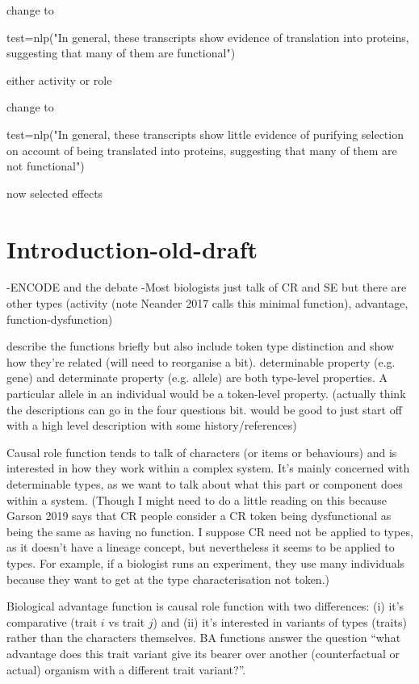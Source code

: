 \documentclass{article}
\begin{document}
change to

test=nlp("In general, these transcripts show evidence of translation into proteins, suggesting that many of them are functional")

either activity or role

change to

test=nlp("In general, these transcripts show little evidence of purifying selection on account of being translated into proteins, suggesting that many of them are not functional")

now selected effects

\section{Introduction-old-draft}
\label{sec:introduction-1}

-ENCODE and the debate
-Most biologists just talk of CR and SE but there are other types (activity (note Neander 2017 calls this minimal function), advantage, function-dysfunction)

describe the functions briefly but also include token type distinction and show how they're related (will need to reorganise a bit). determinable property (e.g. gene) and determinate property (e.g. allele) are both type-level properties. A particular allele in an individual would be a token-level property. (actually think the descriptions can go in the four questions bit. would be good to just start off with a high level description with some history/references)

Causal role function tends to talk of characters (or items or behaviours) and is interested in how they work within a complex system. It's mainly concerned with determinable types, as we want to talk about what this part or component does within a system. (Though I might need to do a little reading on this because Garson 2019 says that CR people consider a CR token being dysfunctional as being the same as having no function. I suppose CR need not be applied to types, as it doesn't have a lineage concept, but nevertheless it seems to be applied to types. For example, if a biologist runs an experiment, they use many individuals because they want to get at the type characterisation not token.)

Biological advantage function is causal role function with two differences: (i) it's comparative (trait $i$ vs trait $j$) and (ii) it's interested in variants of types (traits) rather than the characters themselves. BA functions answer the question ``what advantage does this trait variant give its bearer over another (counterfactual or actual) organism with a different trait variant?''.
\end{document}
